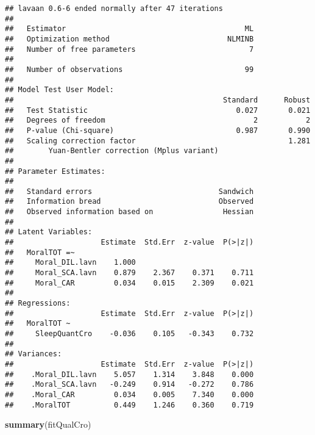 \documentclass[
]{book}
\newenvironment{Shaded}{\begin{snugshade}}{\end{snugshade}}
\newcommand{\KeywordTok}[1]{\textcolor[rgb]{0.13,0.29,0.53}{\textbf{#1}}}
\newcommand{\NormalTok}[1]{#1}
\begin{document}
\begin{verbatim}
## lavaan 0.6-6 ended normally after 47 iterations
## 
##   Estimator                                         ML
##   Optimization method                           NLMINB
##   Number of free parameters                          7
##                                                       
##   Number of observations                            99
##                                                       
## Model Test User Model:
##                                                Standard      Robust
##   Test Statistic                                  0.027       0.021
##   Degrees of freedom                                  2           2
##   P-value (Chi-square)                            0.987       0.990
##   Scaling correction factor                                   1.281
##        Yuan-Bentler correction (Mplus variant)                     
## 
## Parameter Estimates:
## 
##   Standard errors                             Sandwich
##   Information bread                           Observed
##   Observed information based on                Hessian
## 
## Latent Variables:
##                    Estimate  Std.Err  z-value  P(>|z|)
##   MoralTOT =~                                         
##     Moral_DIL.lavn    1.000                           
##     Moral_SCA.lavn    0.879    2.367    0.371    0.711
##     Moral_CAR         0.034    0.015    2.309    0.021
## 
## Regressions:
##                    Estimate  Std.Err  z-value  P(>|z|)
##   MoralTOT ~                                          
##     SleepQuantCro    -0.036    0.105   -0.343    0.732
## 
## Variances:
##                    Estimate  Std.Err  z-value  P(>|z|)
##    .Moral_DIL.lavn    5.057    1.314    3.848    0.000
##    .Moral_SCA.lavn   -0.249    0.914   -0.272    0.786
##    .Moral_CAR         0.034    0.005    7.340    0.000
##    .MoralTOT          0.449    1.246    0.360    0.719
\end{verbatim}

\begin{Shaded}
\begin{Highlighting}[]
\KeywordTok{summary}\NormalTok{(fitQualCro)}
\end{Highlighting}
\end{Shaded}
\end{document}
